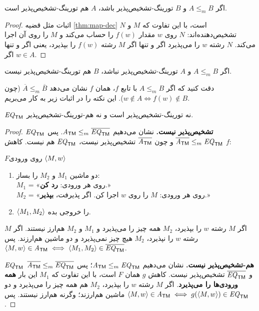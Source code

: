 \begin{theorem}\label{thm:map-rec}
اگر $A\le_m B$ و $B$ تورینگ-تشخیص‌پذیر باشد، $A$ هم تورینگ-تشخیص‌پذیر است.
\end{theorem}
\begin{proof}
اثبات مثل قضیه \ref{thm:map-dec} است، با این تفاوت که $M$ و $N$ تشخیص‌دهنده‌اند: $N$ روی $w$ مقدار $f(w)$ را حساب می‌کند و $M$ را روی آن اجرا می‌کند. $N$ رشته $w$ را می‌پذیرد اگر و تنها اگر $M$ رشته $f(w)$ را بپذیرد، یعنی اگر و تنها اگر $w\in A$.
\end{proof}

\begin{corollary}
اگر $A\le_m B$ و $A$ تورینگ-تشخیص‌پذیر نباشد، $B$ هم تورینگ-تشخیص‌پذیر نیست.
\end{corollary}

دقت کنید که اگر $A\le_m B$ با تابع $f$، همان $f$ نشان می‌دهد $\overline{A}\le_m\overline{B}$ (چون $w\notin A\iff f(w)\notin B$). این نکته را در اثبات زیر به کار می‌بریم.

\begin{theorem}
$\mathit{EQ}_{\mathsf{TM}}$ نه تورینگ-تشخیص‌پذیر است و نه هم-تورینگ-تشخیص‌پذیر.
\end{theorem}
\begin{proof}
\textbf{$\mathit{EQ}_{\mathsf{TM}}$ تشخیص‌پذیر نیست.} نشان می‌دهیم $\mathit{A}_{\mathsf{TM}}\le_m\overline{\mathit{EQ}_{\mathsf{TM}}}$. پس $\overline{\mathit{A}_{\mathsf{TM}}}\le_m\mathit{EQ}_{\mathsf{TM}}$ و چون $\overline{\mathit{A}_{\mathsf{TM}}}$ تشخیص‌پذیر نیست، $\mathit{EQ}_{\mathsf{TM}}$ هم نیست. کاهش $f$:
\begin{algo}{$F$}{روی ورودی $\langle M,w\rangle$}
\begin{enumerate}
\item دو ماشین $M_1$ و $M_2$ را بساز:\\
$M_1$ = «روی هر ورودی: \textbf{رد کن}.»\\
$M_2$ = «روی هر ورودی: $M$ را روی $w$ اجرا کن. اگر پذیرفت، \textbf{بپذیر}.»
\item $\langle M_1,M_2\rangle$ را خروجی بده.
\end{enumerate}
\end{algo}
اگر $M$ رشته $w$ را بپذیرد، $M_2$ همه چیز را می‌پذیرد و $M_1$ و $M_2$ هم‌ارز نیستند. اگر $M$ رشته $w$ را نپذیرد، $M_2$ هیچ چیز نمی‌پذیرد و دو ماشین هم‌ارزند. پس $\langle M,w\rangle\in\mathit{A}_{\mathsf{TM}}\iff\langle M_1,M_2\rangle\in\overline{\mathit{EQ}_{\mathsf{TM}}}$.

\textbf{$\mathit{EQ}_{\mathsf{TM}}$ هم-تشخیص‌پذیر نیست.} نشان می‌دهیم $\mathit{A}_{\mathsf{TM}}\le_m\mathit{EQ}_{\mathsf{TM}}$؛ پس $\overline{\mathit{A}_{\mathsf{TM}}}\le_m\overline{\mathit{EQ}_{\mathsf{TM}}}$ و $\overline{\mathit{EQ}_{\mathsf{TM}}}$ تشخیص‌پذیر نیست. کاهش $g$ همان $F$ است، با این تفاوت که $M_1$ این بار \textbf{همه ورودی‌ها را می‌پذیرد}. اگر $M$ رشته $w$ را بپذیرد، $M_2$ هم همه چیز را می‌پذیرد و دو ماشین هم‌ارزند؛ وگرنه هم‌ارز نیستند. پس $\langle M,w\rangle\in\mathit{A}_{\mathsf{TM}}\iff g(\langle M,w\rangle)\in\mathit{EQ}_{\mathsf{TM}}$.
\end{proof}

